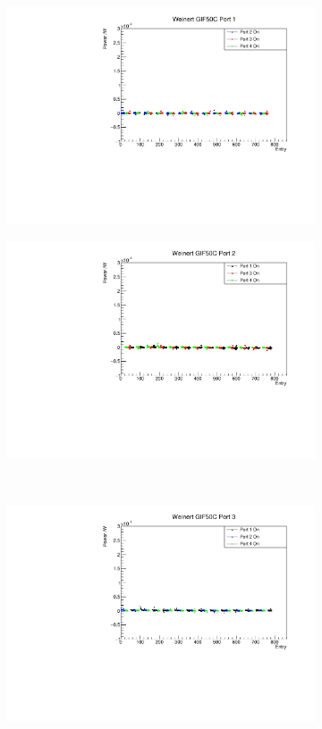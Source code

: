 \documentclass[a4paper,11pt]{article}
\begin{document}
\begin{figure}[h!]
\centering
\begin{subfigure}{0.5\textwidth}
\includegraphics[width=\linewidth]{WeinertGIF50CPort1.pdf}
\subcaption{}\label{fig:weingifcrosstalkport1}
\end{subfigure}%
\begin{subfigure}{0.5\textwidth}
\includegraphics[width=\linewidth]{WeinertGIF50CPort2.pdf}
\subcaption{}\label{fig:weingifcrosstalkport2}
\end{subfigure}
\\
\begin{subfigure}{0.5\textwidth}
\includegraphics[width=\linewidth]{WeinertGIF50CPort3.pdf}

\end{subfigure}
\end{figure}
\end{document}
